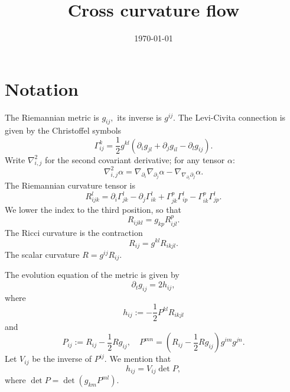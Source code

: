 \documentclass{amsart}
\theoremstyle{definition}
\theoremstyle{remark}
\numberwithin{equation}{section}
\begin{document}
\title[Cross curvature flow]
 {Cross curvature flow}

\curraddr{}
\email{}
\date{\today}

\dedicatory{}
\subjclass[2010]{}
\keywords{}

\begin{abstract}
\end{abstract}

\maketitle

\section{Notation}
The Riemannian metric is $g_{ij},$ its inverse is $g^{ij}$. The Levi-Civita connection is given by the Christoffel symbols
\begin{equation}
\Gamma_{ij}^k=\frac{1}{2}g^{kl}\left(\partial_ig_{jl}+\partial_jg_{il}-\partial_lg_{ij}\right).
\end{equation}
Write $\nabla^2_{i,j}$ for the second covariant derivative; for any tensor $\alpha:$
\[\nabla^2_{i,j}\alpha=\nabla_{\partial_i}\nabla_{\partial_j}\alpha-\nabla_{\nabla_{\partial_i}\partial_j}\alpha.\]
The Riemannian curvature tensor is
\begin{equation}
R_{ijk}^l=\partial_i\Gamma_{jk}^l-\partial_j\Gamma_{ik}^l+\Gamma_{jk}^p\Gamma_{ip}^l-\Gamma_{ik}^p\Gamma_{jp}^l.
\end{equation}
We lower the index to the third position, so that
\begin{equation}
R_{ijkl}=g_{kp}R_{ijl}^p.
\end{equation}
The Ricci curvature is the contraction
\begin{equation}
R_{ij}=g^{kl}R_{ikjl}.
\end{equation}
The scalar curvature $R=g^{ij}R_{ij}.$


The evolution equation of the metric is given by
\begin{equation}
\partial_tg_{ij}=2h_{ij},
\end{equation}
where
\begin{equation}
h_{ij}:=-\frac{1}{2}P^{kl}R_{ikjl}
\end{equation}
and
\begin{equation}
P_{ij}:=R_{ij}-\frac{1}{2}Rg_{ij},\quad
P^{mn}=\left(R_{ij}-\frac{1}{2}Rg_{ij}\right)g^{im}g^{jn}.
\end{equation}
Let $V_{ij}$ be the inverse of $P^{ij}$. We mention that
\begin{equation}
h_{ij}=V_{ij}\det P,
\end{equation}
where $\det P = \det (g_{km} P^{ml}).$
\end{document}

